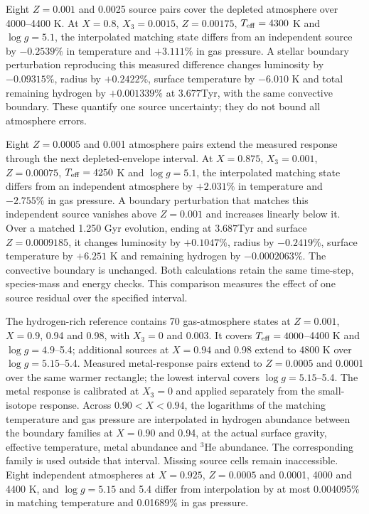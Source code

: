 \documentclass[11pt,letterpaper]{article}
\newcommand{\Tyr}{\mathrm{Tyr}}
\begin{document}
Eight $Z=0.001$ and 0.0025 source pairs cover the depleted
atmosphere over 4000--4400 K. At $X=0.8$, $X_3=0.0015$, $Z=0.00175$,
$T_{\rm eff}=4300$ K and $\log g=5.1$, the interpolated matching
state differs from an independent source by $-0.2539\%$ in temperature
and $+3.111\%$ in gas pressure. A stellar boundary perturbation reproducing
this measured difference changes luminosity by $-0.09315\%$, radius by
$+0.2422\%$, surface temperature by $-6.010$ K and total remaining hydrogen
by $+0.001339\%$ at $3.677\Tyr$, with the same convective boundary.
These quantify one source uncertainty; they do not bound all atmosphere errors.

Eight $Z=0.0005$ and 0.001 atmosphere pairs extend the measured response
through the next depleted-envelope interval. At $X=0.875$, $X_3=0.001$,
$Z=0.00075$, $T_{\rm eff}=4250$ K and $\log g=5.1$, the interpolated
matching state differs from an independent atmosphere by $+2.031\%$ in
temperature and $-2.755\%$ in gas pressure. A boundary perturbation that
matches this independent source vanishes above $Z=0.001$ and increases
linearly below it. Over a matched 1.250 Gyr evolution, ending at
$3.687\Tyr$ and surface $Z=0.0009185$, it changes luminosity by
$+0.1047\%$, radius by $-0.2419\%$, surface temperature by $+6.251$ K
and remaining hydrogen by $-0.0002063\%$. The convective boundary is
unchanged. Both calculations retain the same time-step, species-mass and
energy checks. This comparison measures the effect of one source residual
over the specified interval.

The hydrogen-rich reference contains 70 gas-atmosphere states at
$Z=0.001$, $X=0.9$, 0.94 and 0.98, with $X_3=0$ and 0.003.
It covers $T_{\rm eff}=4000$--4400 K and $\log g=4.9$--5.4;
additional sources at $X=0.94$ and 0.98 extend to 4800 K over
$\log g=5.15$--5.4. Measured metal-response pairs extend to
$Z=0.0005$ and 0.0001 over the same warmer rectangle;
the lowest interval covers $\log g=5.15$--5.4. The metal response is
calibrated at $X_3=0$ and applied separately from the small-isotope response.
Across $0.90<X<0.94$, the logarithms of the matching temperature and gas
pressure are interpolated in hydrogen abundance between the boundary
families at $X=0.90$ and 0.94, at the actual surface gravity, effective
temperature, metal abundance and $^3$He abundance. The corresponding
family is used outside that interval. Missing source cells remain
inaccessible. Eight independent atmospheres
at $X=0.925$, $Z=0.0005$ and 0.0001, 4000 and 4400 K, and
$\log g=5.15$ and 5.4 differ from interpolation by at most 0.004095\%
in matching temperature and 0.01689\% in gas pressure.
\end{document}
